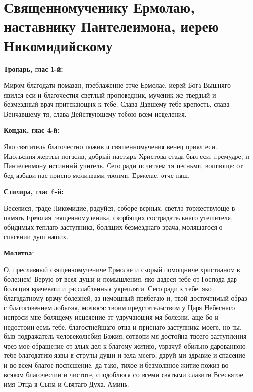 \bigskip\mychapterending


 

\section{Священномученику Ермолаю, наставнику Пантелеимона, иерею Никомидийскому}
 


\bfseries Тропарь, глас 1-й:\normalfont{}\nopagebreak


Миром благодати помазан, преблаженне отче Ермолае, иерей Бога Вышняго явился еси и благочестия светлый проповедник, мученик же твердый и безмездный врач притекающих к тебе. Слава Давшему тебе крепость, слава Венчавшему тя, слава Действующему тобою всем исцеления.


\medskip


\bfseries Кондак, глас 4-й:\normalfont{}\nopagebreak


Яко святитель благочестно пожив и священномучения венец приял еси. Идольския жертвы погасив, добрый пастырь Христова стада был еси, премудре, и Пантелеимону истинный учитель. Сего ради почитаем тя песньми, вопиюще: от бед избави нас присно молитвами твоими, Ермолае, отче наш.


\medskip


\bfseries Стихира, глас 6-й:\normalfont{}\nopagebreak


Веселися, граде Никомидие, радуйся, соборе верных, светло торжествующе в память Ермолая священномученика, скорбящих сострадательнаго утешителя, обидимых теплаго заступника, болящих безмезднаго врача, молящагося о спасении душ наших.


\medskip


\bfseries Молитва:\normalfont{}\nopagebreak


О, преславный священномучениче Ермолае и скорый помощниче христианом в болезнех! Верую от всея души и помышления, яко дадеся тебе от Господа дар болящия врачевати и расслабленныя укрепляти. Сего ради к тебе, яко благодатному врачу болезней, аз немощный прибегаю и, твой досточтимый образ с благоговением лобызая, молюся: твоим предстательством у Царя Небеснаго испроси мне болящему исцеление от удручающия мя болезни, аще бо и недостоин есмь тебе, благостнейшаго отца и приснаго заступника моего, но ты, быв подражатель человеколюбия Божия, сотвори мя достойна твоего заступления чрез мое обращение от злых дел к благому житию, уврачуй обильно дарованною тебе благодатию язвы и струпы души и тела моего, даруй ми здравие и спасение и во всем благое поспешение, да тако, тихое и безмолвное житие пожив во всяком благочестии и чистоте, сподоблюся со всеми святыми славити Всесвятое имя Отца и Сына и Святаго Духа. Аминь.


